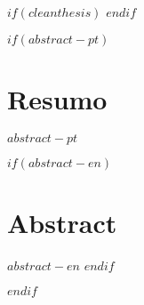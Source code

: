 




$if(cleanthesis)$
\clearpage
\customtitlebackpage
$endif$



$if(abstract-pt)$
\cleardoublepage
\begin{minipage}{\linewidth}

\chapter*{Resumo}
$abstract-pt$

$if(abstract-en)$
\chapter*{Abstract}
$abstract-en$
$endif$

\end{minipage}
\cleardoublepage
$endif$



